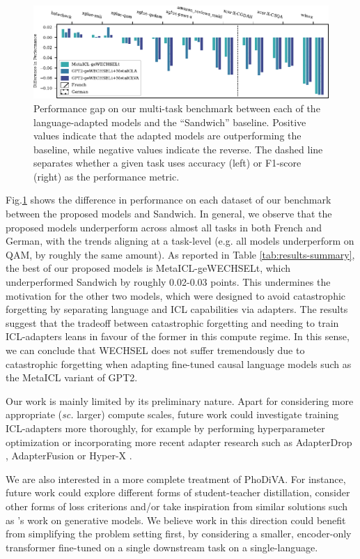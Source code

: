 \documentclass[11pt]{article}
\begin{document}
\begin{figure}[ht]
	\includegraphics{results.pdf}
	\caption{Performance gap on our multi-task benchmark between each of the language-adapted models
		and the ``Sandwich'' baseline. Positive values indicate that the adapted models are
		outperforming the baseline, while negative values indicate the reverse. The dashed line
		separates whether a given task uses accuracy (left) or F1-score (right) as the performance
		metric.}
	\label{fig:results}
\end{figure}

Fig.\@ \ref{fig:results} shows the difference in performance on each dataset of our benchmark
between the proposed models and Sandwich. In general, we observe that the proposed models
underperform across almost all tasks in both French and German, with the trends aligning at
a task-level (e.g. all models underperform on QAM, by roughly the same amount). As reported in Table
\ref{tab:results-summary}, the best of our proposed models is MetaICL-geWECHSELt, which
underperformed Sandwich by roughly 0.02-0.03 points. This undermines the motivation for the other
two models, which were designed to avoid catastrophic forgetting by separating language and ICL
capabilities via adapters. The results suggest that the tradeoff between catastrophic forgetting and
needing to train ICL-adapters leans in favour of the former in this compute regime. In this sense,
we can conclude that WECHSEL does not suffer tremendously due to catastrophic forgetting when
adapting fine-tuned causal language models such as the MetaICL variant of GPT2.

Our work is mainly limited by its preliminary nature. Apart for considering more appropriate
(\textit{sc.} larger) compute scales, future work could investigate training ICL-adapters more
thoroughly, for example by performing hyperparameter optimization or incorporating more recent
adapter research such as AdapterDrop \citep{ruckle_adapterdrop_2021}, AdapterFusion
\citep{pfeiffer_adapterfusion_2021} or Hyper-X \citep{ustun_hyper-x_2022}.

We are also interested in a more complete treatment of PhoDiVA. For instance, future work could
explore different forms of student-teacher distillation, consider other forms of loss criterions
and/or take inspiration from similar solutions such as \citet{khrulkov_disentangled_2021}'s work on
generative models. We believe work in this direction could benefit from simplifying the problem
setting first, by considering a smaller, encoder-only transformer fine-tuned on a single downstream
task on a single-language.
\end{document}
